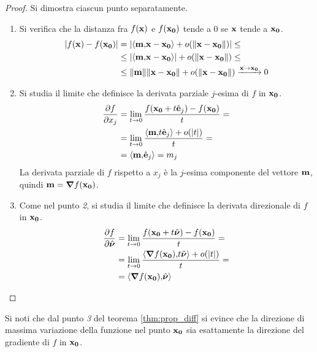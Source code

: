 \begin{proof}
    Si dimostra ciascun punto separatamente.
    \begin{enumerate}
        \item Si verifica che la distanza fra $f(\vb{x})$ e $f(\vb{x_0})$ tende a $0$ se $\vb{x}$ tende a $\vb{x_0}$.
        \begin{align*}
            \abs{f(\vb{x})-f(\vb{x_0})}&=\abs{\left\langle\vb{m}{,}\vb{x}-\vb{x_0}\right\rangle+o(\norm{\vb{\vb{x}-\vb{x_0}}})}\leq\\
            &\leq\abs{\left\langle\vb{m}{,}\vb{\vb{x}-\vb{x_0}}\right\rangle}+o(\norm{\vb{\vb{x}-\vb{x_0}}})\leq\\
            &\leq\norm{\vb{m}}\norm{\vb{x}-\vb{x_0}}+o(\norm{\vb{x}-\vb{x_0}})\xrightarrow{\vb{x}\to\vb{x_0}} 0
        \end{align*}

        \item Si studia il limite che definisce la derivata parziale $j$-esima di $f$ in $\vb{x_0}$.
        \begin{align*}
            \frac{\partial f}{\partial x_j}&=\lim_{t\to 0}\frac{f(\vb{x_0}+t\hat{\vb{e}}_j)-f(\vb{x_0})}{t}=\\
            &=\lim_{t\to 0}\frac{\left\langle\vb{m}{,}t\hat{\vb{e}}_j\right\rangle + o(\abs{t})}{t}=\\
            &=\left\langle\vb{m}{,}\hat{\vb{e}}_j\right\rangle=m_j
        \end{align*}
        La derivata parziale di $f$ rispetto a $x_j$ è la $j$-esima componente del vettore $\vb{m}$, quindi $\vb{m}=\grad f(\vb{x_0})$.

        \item Come nel punto \textit{2}, si studia il limite che definisce la derivata direzionale di $f$ in $\vb{x_0}$.
        \begin{align*}
            \frac{\partial f}{\partial \hat{\bm \nu}}&=\lim_{t\to 0}\frac{f(\vb{x_0}+t\hat{\bm \nu})-f(\vb{x_0})}{t}=\\
            &=\lim_{t\to 0}\frac{\left\langle\grad f(\vb{x_0}){,}t\hat{\bm \nu}\right\rangle + o(\abs{t})}{t}=\\
            &=\left\langle\grad f(\vb{x_0}){,}\hat{\bm \nu}\right\rangle
        \end{align*}
    \end{enumerate}
\end{proof}

\begin{remark}
    Si noti che dal punto \textit{3} del teorema \ref{thm:prop_diff} si evince che la direzione di massima variazione della funzione nel punto $\vb{x_0}$ sia esattamente la direzione del gradiente di $f$ in $\vb{x_0}$.
\end{remark}

